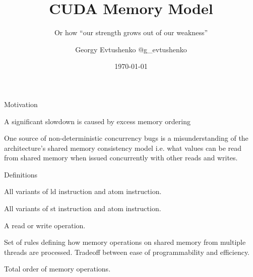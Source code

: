 \documentclass[aspectratio=169,compress]{beamer}
\title{CUDA Memory Model}
\subtitle{Or how ``our strength grows out of our weakness''}
\author{Georgy Evtushenko \faTwitter @g\_evtushenko}
\date{\today}
\begin{document}
\begin{frame}
  \maketitle
\end{frame}

\begin{frame}{Motivation}
  \begin{description}[Performance]
  \item[Performance]
		A significant slowdown is caused by excess memory ordering
  \item[Correctness]
		One source of non-deterministic concurrency bugs is a misunderstanding of the architecture’s shared 
		memory consistency model i.e. what values can be read from shared memory when issued concurrently 
		with other reads and writes. 
  \end{description}
\end{frame}

\begin{frame}{Definitions}
  \begin{description}
  \item[Read operation]
    All variants of \textcolor{NordYellow}{ld} instruction and \textcolor{NordYellow}{atom} instruction.
  \item[Write operation]
    All variants of \textcolor{NordYellow}{st} instruction and \textcolor{NordYellow}{atom} instruction.
  \item[Memory operation]
    A \textcolor{NordYellow}{read} or \textcolor{NordYellow}{write} operation.
  \item[Memory model]
    Set of rules defining how \textcolor{NordYellow}{memory operations} on shared memory from multiple threads are processed.
    Tradeoff between ease of programmability and efficiency.
  \item[Memory order]
    Total order of \textcolor{NordYellow}{memory operations}.
  \end{description}
\end{frame}
\end{document}
